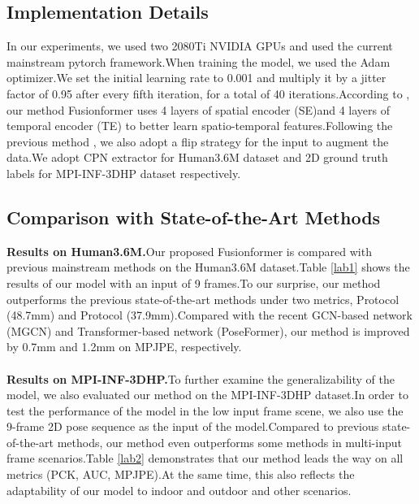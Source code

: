 \documentclass{article}
\begin{document}
\subsection{Implementation Details}		
In our experiments, we used two 2080Ti NVIDIA GPUs and used the current mainstream pytorch framework.When training the model, we used the Adam optimizer.We set the initial learning rate to 0.001 and multiply it by a jitter factor of 0.95 after every fifth iteration, for a total of 40 iterations.According to \cite{zheng20213d}, our method Fusionformer uses 4 layers of spatial encoder (SE)and 4 layers of temporal encoder (TE) to better learn spatio-temporal features.Following the previous method \cite{cai2019exploiting,chen2021anatomy,pavllo20193d,sun2018integral}, we also adopt a flip strategy for the input to augment the data.We adopt CPN extractor for Human3.6M dataset and 2D ground truth labels for MPI-INF-3DHP dataset respectively.\\		
\subsection{Comparison with State-of-the-Art Methods}
\textbf{Results on Human3.6M.}Our proposed Fusionformer is compared with previous mainstream methods on the Human3.6M dataset.Table \ref{lab1} shows the results of our model with an input of 9 frames.To our surprise, our method outperforms the previous state-of-the-art methods under two metrics, Protocol  (48.7mm) and Protocol  (37.9mm).Compared with the recent GCN-based network (MGCN) and Transformer-based network (PoseFormer), our method is improved by 0.7mm and 1.2mm on MPJPE, respectively.\\\\
\textbf{Results on MPI-INF-3DHP.}To further examine the generalizability of the model, we also evaluated our method on the MPI-INF-3DHP dataset.In order to test the performance of the model in the low input frame scene, we also use the 9-frame 2D pose sequence as the input of the model.Compared to previous state-of-the-art methods, our method even outperforms some methods in multi-input frame scenarios.Table \ref{lab2} demonstrates that our method leads the way on all metrics (PCK, AUC, MPJPE).At the same time, this also reflects the adaptability of our model to indoor and outdoor and other scenarios.\\\\
\end{document}
